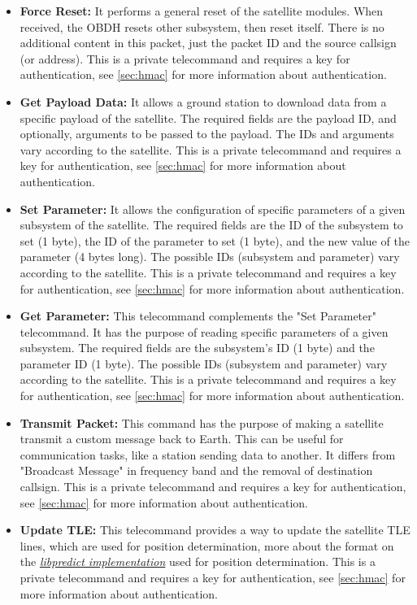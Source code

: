 \begin{itemize}
	\item \textbf{Force Reset:} It performs a general reset of the satellite modules. When received, the OBDH resets other subsystem, then reset itself. There is no additional content in this packet, just the packet ID and the source callsign (or address). This is a private telecommand and requires a key for authentication, see \autoref{sec:hmac} for more information about authentication.
	\item \textbf{Get Payload Data:} It allows a ground station to download data from a specific payload of the satellite. The required fields are the payload ID, and optionally, arguments to be passed to the payload. The IDs and arguments vary according to the satellite. This is a private telecommand and requires a key for authentication, see \autoref{sec:hmac} for more information about authentication.
	\item \textbf{Set Parameter:} It allows the configuration of specific parameters of a given subsystem of the satellite. The required fields are the ID of the subsystem to set (1 byte), the ID of the parameter to set (1 byte), and the new value of the parameter (4 bytes long). The possible IDs (subsystem and parameter) vary according to the satellite. This is a private telecommand and requires a key for authentication, see \autoref{sec:hmac} for more information about authentication.
	\item \textbf{Get Parameter:} This telecommand complements the "Set Parameter" telecommand. It has the purpose of reading specific parameters of a given subsystem. The required fields are the subsystem's ID (1 byte) and the parameter ID (1 byte). The possible IDs (subsystem and parameter) vary according to the satellite. This is a private telecommand and requires a key for authentication, see \autoref{sec:hmac} for more information about authentication.
	\item \textbf{Transmit Packet:} This command has the purpose of making a satellite transmit a custom message back to Earth. This can be useful for communication tasks, like a station sending data to another. It differs from "Broadcast Message" in frequency band and the removal of destination callsign. This is a private telecommand and requires a key for authentication, see \autoref{sec:hmac} for more information about authentication.
	\item \textbf{Update TLE:} This telecommand provides a way to update the satellite TLE lines, which are used for position determination, more about the format on the \textit{\href{https://github.com/c-porto/libpredict/blob/master/include/predict/predict.h}{libpredict implementation}} used for position determination. This is a private telecommand and requires a key for authentication, see \autoref{sec:hmac} for more information about authentication.
\end{itemize}

